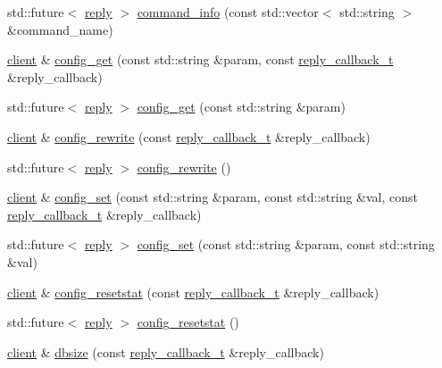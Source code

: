 \begin{DoxyCompactItemize}
\item 
std\+::future$<$ \hyperlink{classcpp__redis_1_1reply}{reply} $>$ \hyperlink{classcpp__redis_1_1client_abd02a4d296ed0c160e935cd176862334}{command\+\_\+info} (const std\+::vector$<$ std\+::string $>$ \&command\+\_\+name)
\item 
\hyperlink{classcpp__redis_1_1client}{client} \& \hyperlink{classcpp__redis_1_1client_a510ede75cc6361f33a4cdd0695f7543f}{config\+\_\+get} (const std\+::string \&param, const \hyperlink{classcpp__redis_1_1client_a061a1140d36d2eaeda82b09a0bb3f9f2}{reply\+\_\+callback\+\_\+t} \&reply\+\_\+callback)
\item 
std\+::future$<$ \hyperlink{classcpp__redis_1_1reply}{reply} $>$ \hyperlink{classcpp__redis_1_1client_a221b1e414a4b1bb4eb2a7afaac0eb39d}{config\+\_\+get} (const std\+::string \&param)
\item 
\hyperlink{classcpp__redis_1_1client}{client} \& \hyperlink{classcpp__redis_1_1client_a8dcf862a8a0cb75f8cc986445eae81cf}{config\+\_\+rewrite} (const \hyperlink{classcpp__redis_1_1client_a061a1140d36d2eaeda82b09a0bb3f9f2}{reply\+\_\+callback\+\_\+t} \&reply\+\_\+callback)
\item 
std\+::future$<$ \hyperlink{classcpp__redis_1_1reply}{reply} $>$ \hyperlink{classcpp__redis_1_1client_a1a001663bd555abb70521924ec2a27f8}{config\+\_\+rewrite} ()
\item 
\hyperlink{classcpp__redis_1_1client}{client} \& \hyperlink{classcpp__redis_1_1client_a0cff7147cd982a39cc84f91243a27364}{config\+\_\+set} (const std\+::string \&param, const std\+::string \&val, const \hyperlink{classcpp__redis_1_1client_a061a1140d36d2eaeda82b09a0bb3f9f2}{reply\+\_\+callback\+\_\+t} \&reply\+\_\+callback)
\item 
std\+::future$<$ \hyperlink{classcpp__redis_1_1reply}{reply} $>$ \hyperlink{classcpp__redis_1_1client_a8fdeb462b43ea6f5199145696713f9b1}{config\+\_\+set} (const std\+::string \&param, const std\+::string \&val)
\item 
\hyperlink{classcpp__redis_1_1client}{client} \& \hyperlink{classcpp__redis_1_1client_a4b1361aa6c997b76a059c144a302b5be}{config\+\_\+resetstat} (const \hyperlink{classcpp__redis_1_1client_a061a1140d36d2eaeda82b09a0bb3f9f2}{reply\+\_\+callback\+\_\+t} \&reply\+\_\+callback)
\item 
std\+::future$<$ \hyperlink{classcpp__redis_1_1reply}{reply} $>$ \hyperlink{classcpp__redis_1_1client_a775508ce5220546e46b573f95d2bcb4d}{config\+\_\+resetstat} ()
\item 
\hyperlink{classcpp__redis_1_1client}{client} \& \hyperlink{classcpp__redis_1_1client_a87a8351f0a6927db52b4ab2a5b9192c9}{dbsize} (const \hyperlink{classcpp__redis_1_1client_a061a1140d36d2eaeda82b09a0bb3f9f2}{reply\+\_\+callback\+\_\+t} \&reply\+\_\+callback)

\end{DoxyCompactItemize}
